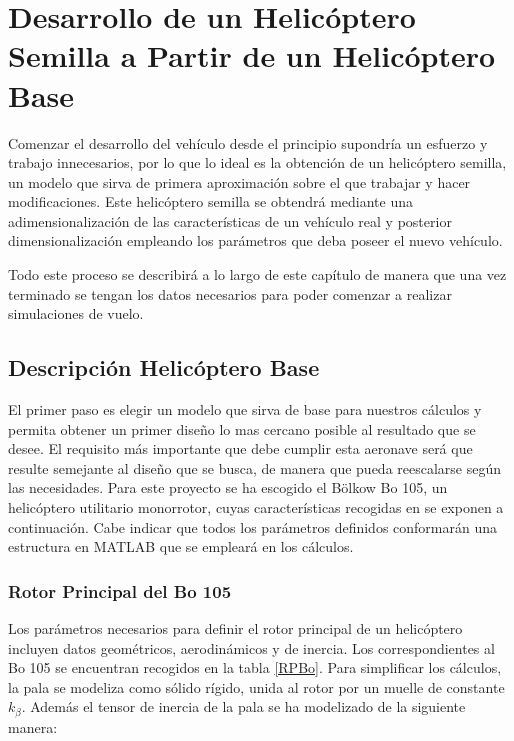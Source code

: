 \thispagestyle{empty}

\chapter{Desarrollo de un Helicóptero Semilla a Partir de un Helicóptero Base}


Comenzar el desarrollo del vehículo desde el principio supondría un esfuerzo y trabajo innecesarios, por lo que lo ideal es la obtención de un helicóptero semilla, un modelo que sirva de primera aproximación sobre el que trabajar y hacer modificaciones. Este helicóptero semilla se obtendrá mediante una adimensionalización de las características de un vehículo real y posterior dimensionalización empleando los parámetros que deba poseer el nuevo vehículo.

Todo este proceso se describirá a lo largo de este capítulo de manera que una vez terminado se tengan los datos necesarios para poder comenzar a realizar simulaciones de vuelo.

\section{Descripción Helicóptero Base}

El primer paso es elegir un modelo que sirva de base para nuestros cálculos y permita obtener un primer diseño lo mas cercano posible al resultado que se desee. El requisito más importante que debe cumplir esta aeronave será que resulte semejante al diseño que se busca, de manera que pueda reescalarse según las necesidades. Para este proyecto se ha escogido el Bölkow Bo 105, un helicóptero utilitario monorrotor, cuyas características recogidas en \citet{Padfield} se exponen a continuación. Cabe indicar que todos los parámetros definidos conformarán una estructura en MATLAB que se empleará en los cálculos.

\subsection{Rotor Principal del Bo 105}

Los parámetros necesarios para definir el rotor principal de un helicóptero incluyen datos geométricos, aerodinámicos y de inercia. Los correspondientes al Bo 105 se encuentran recogidos en la tabla \ref{RPBo}.
Para simplificar los cálculos, la pala se modeliza como sólido rígido, unida al rotor por un muelle de constante $k_\beta$.
Además el tensor de inercia de la pala se ha modelizado de la siguiente manera:

